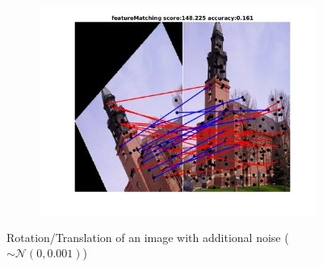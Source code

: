 \begin{figure}[h]
\begin{subfigure}[b]{0.33\textwidth}
		\includegraphics[scale=0.25]{"chapter3/fig/ImageTrafo/anchor_descr/using_cpd_afftrafo/fi_5_featureMatching"} 
	\end{subfigure} 	
	\caption{Rotation/Translation of an image with additional noise ($\sim\mathcal{N}(0,0.001)$)}
\end{figure}

\FloatBarrier

